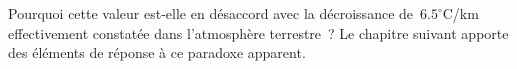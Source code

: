 	

Pourquoi cette valeur est-elle en désaccord avec la décroissance de~$6.5^{\circ}$C/km effectivement constatée dans l'atmosphère terrestre~? Le chapitre suivant apporte des éléments de réponse à ce paradoxe apparent.





